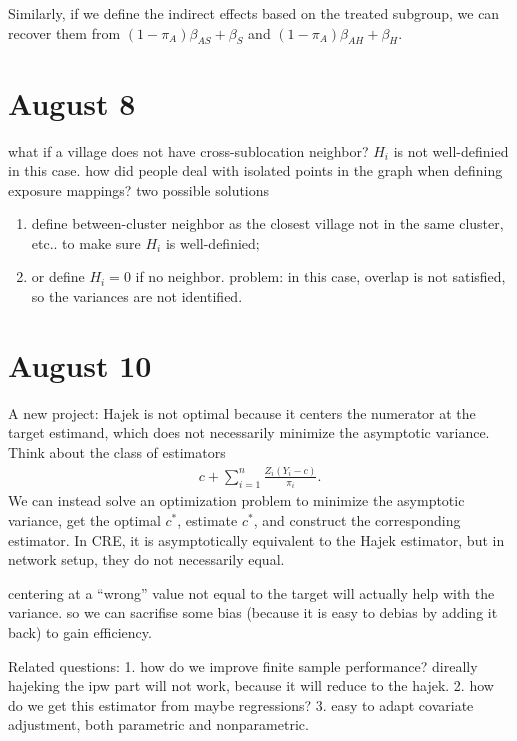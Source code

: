 \documentclass{article}
\newcommand{\sumi}{\sum_{i=1}^n}
\begin{document}
Similarly, if we define the indirect effects based on the treated subgroup, we can recover them from $(1-\pi_A) \beta_{AS} + \beta_{S}$ and $(1-\pi_A) \beta_{AH} + \beta_{H}$.

\section{August 8}
what if a village does not have cross-sublocation neighbor? $H_i$ is not well-definied in this case. how did people deal with isolated points in the graph when defining exposure mappings? two possible solutions
\begin{enumerate}
    \item define between-cluster neighbor as the closest village not in the same cluster, etc.. to make sure $H_i$ is well-definied;
    \item or define $H_i=0$ if no neighbor. problem: in this case, overlap is not satisfied, so the variances are not identified. \citep{aronow2017estimating}
\end{enumerate}

\section{August 10}
A new project:
Hajek is not optimal because it centers the numerator at the target estimand, which does not necessarily minimize the asymptotic variance.
Think about the class of estimators
\begin{eqnarray*}
    c + \sumi\frac{Z_i (Y_i-c)}{\pi_i}.
\end{eqnarray*}
We can instead solve an optimization problem to minimize the asymptotic variance, get the optimal $c^*$, estimate $c^*$, and construct the corresponding estimator. In CRE, it is asymptotically equivalent to the Hajek estimator, but in network setup, they do not necessarily equal. 

centering at a ``wrong'' value not equal to the target will actually help with the variance. so we can sacrifise some bias (because it is easy to debias by adding it back) to gain efficiency.

Related questions:
1. how do we improve finite sample performance? direally hajeking the ipw part will not work, because it will reduce to the hajek.
2. how do we get this estimator from maybe regressions?
3. easy to adapt covariate adjustment, both parametric and nonparametric.

\end{document}
